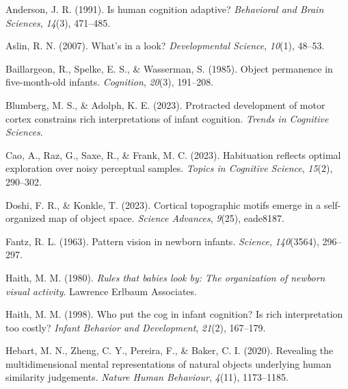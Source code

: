 \documentclass[10pt, letterpaper]{article}
\newenvironment{CSLReferences}%
  {}%
  {\par}
\begin{document}
\hypertarget{refs}{}
\begin{CSLReferences}{1}{0}
\leavevmode{}%
Anderson, J. R. (1991). Is human cognition adaptive? \emph{Behavioral
and Brain Sciences}, \emph{14}(3), 471--485.

\leavevmode{}%
Aslin, R. N. (2007). What's in a look? \emph{Developmental Science},
\emph{10}(1), 48--53.

\leavevmode{}%
Baillargeon, R., Spelke, E. S., \& Wasserman, S. (1985). Object
permanence in five-month-old infants. \emph{Cognition}, \emph{20}(3),
191--208.

\leavevmode{}%
Blumberg, M. S., \& Adolph, K. E. (2023). Protracted development of
motor cortex constrains rich interpretations of infant cognition.
\emph{Trends in Cognitive Sciences}.

\leavevmode{}%
Cao, A., Raz, G., Saxe, R., \& Frank, M. C. (2023). Habituation reflects
optimal exploration over noisy perceptual samples. \emph{Topics in
Cognitive Science}, \emph{15}(2), 290--302.

\leavevmode{}%
Doshi, F. R., \& Konkle, T. (2023). Cortical topographic motifs emerge
in a self-organized map of object space. \emph{Science Advances},
\emph{9}(25), eade8187.

\leavevmode{}%
Fantz, R. L. (1963). Pattern vision in newborn infants. \emph{Science},
\emph{140}(3564), 296--297.

\leavevmode{}%
Haith, M. M. (1980). \emph{Rules that babies look by: The organization
of newborn visual activity}. Lawrence Erlbaum Associates.

\leavevmode{}%
Haith, M. M. (1998). Who put the cog in infant cognition? Is rich
interpretation too costly? \emph{Infant Behavior and Development},
\emph{21}(2), 167--179.

\leavevmode{}%
Hebart, M. N., Zheng, C. Y., Pereira, F., \& Baker, C. I. (2020).
Revealing the multidimensional mental representations of natural objects
underlying human similarity judgements. \emph{Nature Human Behaviour},
\emph{4}(11), 1173--1185.


\end{CSLReferences}
\end{document}

